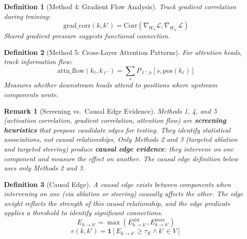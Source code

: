 \documentclass[11pt]{article}
\newtheorem{definition}{Definition}[section]
\newtheorem{remark}{Remark}[section]
\begin{document}
\begin{definition}[Method 4: Gradient Flow Analysis]
\label{def:edge-gradient-flow-analysis}
Track gradient correlation during training:
\begin{equation}
\text{grad\_corr}(k, k') = \text{Corr}(\nabla_{W_k} \mathcal{L}, \nabla_{W_{k'}} \mathcal{L})
\end{equation}
Shared gradient pressure suggests functional connection.
\end{definition}

\begin{definition}[Method 5: Cross-Layer Attention Patterns]
\label{def:edge-cross-layer-attention-patterns}
For attention heads, track information flow:
\begin{equation}
\text{attn\_flow}(k_\ell, k_{\ell'}) = \sum_s P_{\ell',h}[s, \text{pos}(k_\ell)]
\end{equation}
Measures whether downstream heads attend to positions where upstream components wrote.
\end{definition}

\begin{remark}[Screening vs.\ Causal Edge Evidence]
Methods 1, 4, and 5 (activation correlation, gradient correlation, attention flow) are \textbf{screening heuristics} that propose candidate edges for testing. They identify statistical associations, not causal relationships. Only Methods 2 and 3 (targeted ablation and targeted steering) produce \textbf{causal edge evidence}: they intervene on one component and measure the effect on another. The causal edge definition below uses only Methods 2 and 3.
\end{remark}

\begin{definition}[Causal Edge]
\label{def:causal-edge}
A causal edge exists between components when intervening on one (via ablation or steering) causally affects the other. The edge weight reflects the strength of this causal relationship, and the edge predicate applies a threshold to identify significant connections.
\begin{equation}
E_{k \to k'} = \max\left(E^{\text{abl}}_{k \to k'}, E^{\text{steer}}_{k \to k'}\right)
\end{equation}
\begin{equation}
e(k, k') = \mathbf{1}\left[E_{k \to k'} \geq \tau_E \land k' \in V\right]
\end{equation}
\end{definition}
\end{document}
